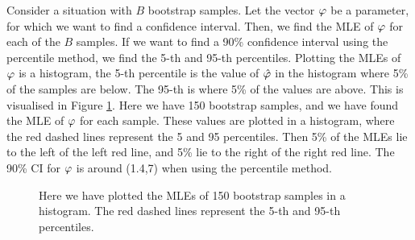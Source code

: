 Consider a situation with $B$ bootstrap samples. Let the vector $\varphi$ be a parameter, for which we want to find a confidence interval. Then, we find the MLE of $\varphi$ for each of the $B$ samples.
If we want to find a 90\% confidence interval using the percentile method, we find the 5-th and 95-th percentiles. 
Plotting the MLEs of $\varphi$ is a histogram, the 5-th percentile is the value of $\hat{\varphi}$ in the histogram where 5\% of the samples are below. The 95-th is where 5\% of the values are above. This is visualised in Figure \ref{percentile_ci_example}. Here we have 150 bootstrap samples, and we have found the MLE of $\varphi$ for each sample. These values are plotted in a histogram, where the red dashed lines represent the 5 and 95 percentiles. Then 5\% of the MLEs lie to the left of the left red line, and 5\% lie to the right of the right red line. The 90\% CI for $\varphi$ is around (1.4,7) when using the percentile method.
\begin{figure}
    \centering
    
    \caption[Bootstrap Example]{Here we have plotted the MLEs of 150 bootstrap samples in a histogram. The red dashed lines represent the 5-th and 95-th percentiles.}
    \label{percentile_ci_example}
\end{figure}
